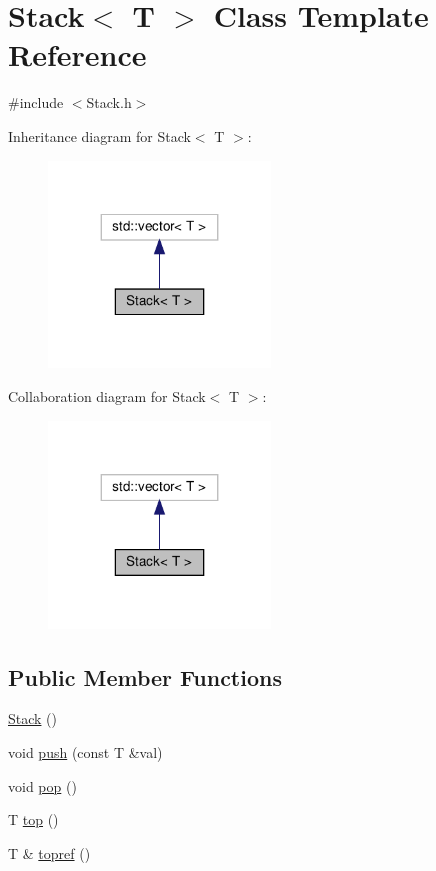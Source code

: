 \hypertarget{class_stack}{}\section{Stack$<$ T $>$ Class Template Reference}
\label{class_stack}


{\ttfamily \#include $<$Stack.\+h$>$}



Inheritance diagram for Stack$<$ T $>$\+:
\nopagebreak
\begin{figure}[H]
\begin{center}
\leavevmode
\includegraphics[width=167pt]{class_stack__inherit__graph}
\end{center}
\end{figure}


Collaboration diagram for Stack$<$ T $>$\+:
\nopagebreak
\begin{figure}[H]
\begin{center}
\leavevmode
\includegraphics[width=167pt]{class_stack__coll__graph}
\end{center}
\end{figure}
\subsection*{Public Member Functions}
\begin{DoxyCompactItemize}
\item 
\hyperlink{class_stack_aefee698059467258bbd79045aca62a63}{Stack} ()
\item 
void \hyperlink{class_stack_a6e8312460808f468b004d709d3308757}{push} (const T \&val)
\item 
void \hyperlink{class_stack_a2723aec5c7e2611b97fcffeb7709de33}{pop} ()
\item 
T \hyperlink{class_stack_ad461f6de40c8672dbf743068f4515061}{top} ()
\item 
T \& \hyperlink{class_stack_a318da5613921ddf481a21c62ce006c3c}{topref} ()
\end{DoxyCompactItemize}


